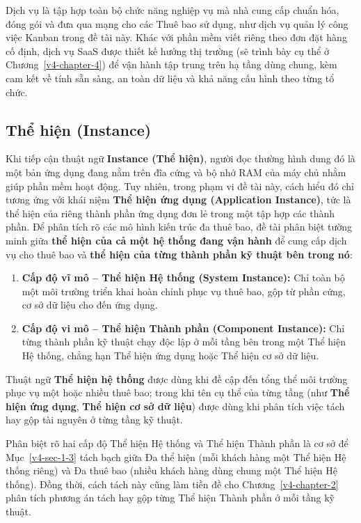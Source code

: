 Dịch vụ là tập hợp toàn bộ chức năng nghiệp vụ mà nhà cung cấp chuẩn hóa, đóng gói và đưa qua mạng cho các Thuê bao sử dụng, như dịch vụ quản lý công việc Kanban trong đề tài này. Khác với phần mềm viết riêng theo đơn đặt hàng cố định, dịch vụ SaaS được thiết kế hướng thị trường (sẽ trình bày cụ thể ở Chương~\ref{v4-chapter-4}) để vận hành tập trung trên hạ tầng dùng chung, kèm cam kết về tính sẵn sàng, an toàn dữ liệu và khả năng cấu hình theo từng tổ chức.

\subsection{Thể hiện (Instance)}\label{v4-sec-1-2-3}

Khi tiếp cận thuật ngữ \textbf{Instance (Thể hiện)}, người đọc thường hình dung đó là một bản ứng dụng đang nằm trên đĩa cứng và bộ nhớ RAM của máy chủ nhằm giúp phần mềm hoạt động. Tuy nhiên, trong phạm vi đề tài này, cách hiểu đó chỉ tương ứng với khái niệm \textbf{Thể hiện ứng dụng (Application Instance)}, tức là thể hiện của riêng thành phần ứng dụng đơn lẻ trong một tập hợp các thành phần. Để phân tích rõ các mô hình kiến trúc đa thuê bao, đề tài phân biệt tường minh giữa \textbf{thể hiện của cả một hệ thống đang vận hành} để cung cấp dịch vụ cho thuê bao và \textbf{thể hiện của từng thành phần kỹ thuật bên trong nó}:

\begin{enumerate}
\def\labelenumi{\arabic{enumi}.}
\item
  \textbf{Cấp độ vĩ mô -- Thể hiện Hệ thống (System Instance):} Chỉ toàn bộ một môi trường triển khai hoàn chỉnh phục vụ thuê bao, gộp từ phần cứng, cơ sở dữ liệu cho đến ứng dụng.
\item
  \textbf{Cấp độ vi mô -- Thể hiện Thành phần (Component Instance):} Chỉ từng thành phần kỹ thuật chạy độc lập ở mỗi tầng bên trong một Thể hiện Hệ thống, chẳng hạn Thể hiện ứng dụng hoặc Thể hiện cơ sở dữ liệu.
\end{enumerate}

Thuật ngữ \textbf{Thể hiện hệ thống} được dùng khi đề cập đến tổng thể môi trường phục vụ một hoặc nhiều thuê bao; trong khi tên cụ thể của từng tầng (như \textbf{Thể hiện ứng dụng}, \textbf{Thể hiện cơ sở dữ liệu}) được dùng khi phân tích việc tách hay gộp tài nguyên ở từng tầng kỹ thuật.

Phân biệt rõ hai cấp độ Thể hiện Hệ thống và Thể hiện Thành phần là cơ sở để Mục~\ref{v4-sec-1-3} tách bạch giữa Đa thể hiện (mỗi khách hàng một Thể hiện Hệ thống riêng) và Đa thuê bao (nhiều khách hàng dùng chung một Thể hiện Hệ thống). Đồng thời, cách tách này cũng làm tiền đề cho Chương~\ref{v4-chapter-2} phân tích phương án tách hay gộp từng Thể hiện Thành phần ở mỗi tầng kỹ thuật.

